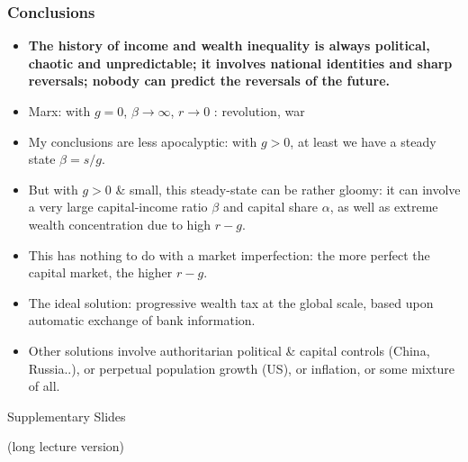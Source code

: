 \documentclass[t]{beamer}\usepackage[]{graphicx}\usepackage[]{color}
\begin{document}
\begin{frame}[label=Conclusions_1,shrink=7]
\frametitle{Conclusions}
\begin{itemize}
\item
\textbf{The history of income and wealth inequality is always political, chaotic and unpredictable; it involves national identities and sharp reversals; nobody can predict the reversals of the future.}
\item
Marx: with $g=0$, $\beta \to \infty$, $r \to 0$ : revolution, war
\item
My conclusions are less apocalyptic: with $g>0$, at least we have a steady state $\beta = s/g$.
\item
But with $g>0$ \& small, this steady-state can be rather gloomy: it can involve a very large capital-income ratio $\beta$ and capital share $\alpha$, as well as extreme wealth concentration due to high $r-g$.
\item
This has nothing to do with a market imperfection: the more perfect the capital market, the higher $r-g$.
\item
The ideal solution: progressive wealth tax at the global scale, based upon automatic exchange of bank information.
\item
Other solutions involve authoritarian political \& capital controls (China, Russia..), or perpetual population growth (US), or inflation, or some mixture of all.
\end{itemize}
\end{frame}


\begin{frame}[label=Transition_1]
\begin{center}
\begin{huge}
Supplementary Slides
\vspace{3\baselineskip}\par
(long lecture version)
\end{huge}
\end{center}
\end{frame}


\end{document}
